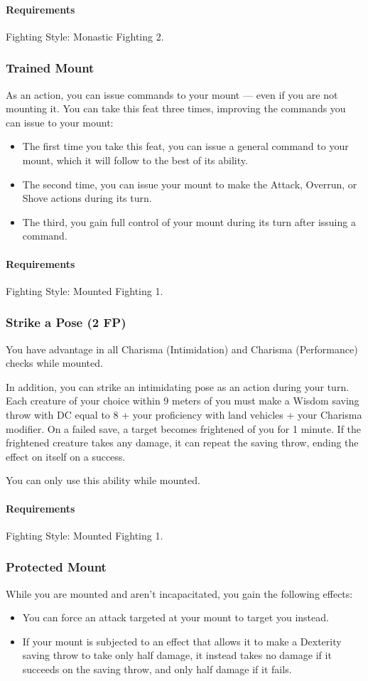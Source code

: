     \paragraph{Requirements} Fighting Style: Monastic Fighting 2.
\subsubsection{Trained Mount} \label{feat::trainedmount}
    As an action, you can issue commands to your mount --- even if you are not mounting it.
    You can take this feat three times, improving the commands you can issue to your mount:
    \begin{itemize}
        \item The first time you take this feat, you can issue a general command to your mount, which it will follow to the best of its ability.
        \item The second time, you can issue your mount to make the Attack, Overrun, or Shove actions during its turn.
        \item The third, you gain full control of your mount during its turn after issuing a command.
    \end{itemize}
    \paragraph{Requirements} Fighting Style: Mounted Fighting 1.
\subsubsection{Strike a Pose (2 FP)} \label{feat::strikeapose}
    You have advantage in all Charisma (Intimidation) and Charisma (Performance) checks while mounted.

    In addition, you can strike an intimidating pose as an action during your turn.
    Each creature of your choice within 9 meters of you must make a Wisdom saving throw with DC equal to 8 + your proficiency with land vehicles + your Charisma modifier.
    On a failed save, a target becomes frightened of you for 1 minute.
    If the frightened creature takes any damage, it can repeat the saving throw, ending the effect on itself on a success.

    You can only use this ability while mounted.
    \paragraph{Requirements} Fighting Style: Mounted Fighting 1.
\subsubsection{Protected Mount} \label{feat::protectedmount}
    While you are mounted and aren't incapacitated, you gain the following effects:
    \begin{itemize}
        \item You can force an attack targeted at your mount to target you instead.
        \item If your mount is subjected to an effect that allows it to make a Dexterity saving throw to take only half damage, it instead takes no damage if it succeeds on the saving throw, and only half damage if it fails.
    \end{itemize}

